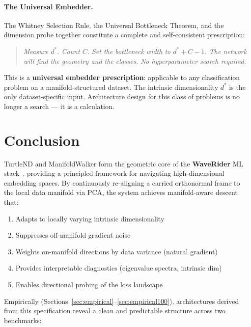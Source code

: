 \documentclass[11pt,letterpaper]{article}
\begin{document}
\paragraph{The Universal Embedder.}
The Whitney Selection Rule, the Universal Bottleneck Theorem, and the
dimension probe together constitute a complete and self-consistent
prescription:

\begin{quote}
\emph{Measure $d^*$.  Count $C$.  Set the bottleneck width to $d^* + C - 1$.
The network will find the geometry and the classes.
No hyperparameter search required.}
\end{quote}

This is a \textbf{universal embedder prescription}: applicable to any
classification problem on a manifold-structured dataset.
The intrinsic dimensionality $d^*$ is the only dataset-specific input.
Architecture design for this class of problems is no longer a search —
it is a calculation.

\section{Conclusion}
\label{sec:conclusion}

TurtleND and ManifoldWalker form the geometric core of the \textbf{WaveRider}
ML stack~\cite{waverider2026}, providing a principled framework for
navigating high-dimensional embedding spaces.  By continuously re-aligning
a carried orthonormal frame to the local data manifold via PCA, the system
achieves manifold-aware descent that:
\begin{enumerate}[nosep]
  \item Adapts to locally varying intrinsic dimensionality
  \item Suppresses off-manifold gradient noise
  \item Weights on-manifold directions by data variance (natural gradient)
  \item Provides interpretable diagnostics (eigenvalue spectra, intrinsic dim)
  \item Enables directional probing of the loss landscape
\end{enumerate}

Empirically (Sections~\ref{sec:empirical}--\ref{sec:empirical100}),
architectures derived from this specification reveal a clean and
predictable structure across two benchmarks:
\end{document}

